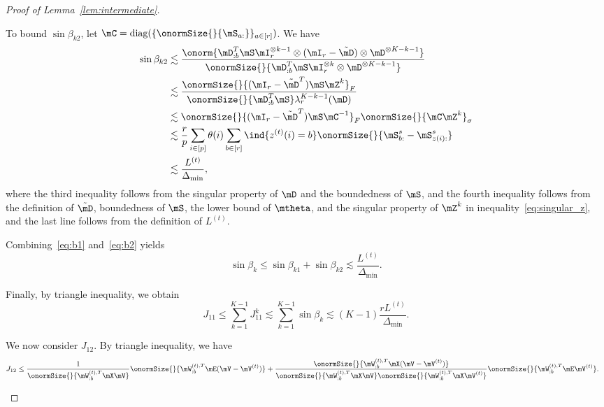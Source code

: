 \documentclass[lettersize,onecolumn,journal]{IEEEtran}
\theoremstyle{definition}
\theoremstyle{definition}
\def\fixme#1#2{\textbf{\color{red}[FIXME (#1): #2]}}
\begin{document}
\begin{proof}[Proof of Lemma~\ref{lem:intermediate}]
\begin{enumerate}[wide]
    To bound $\sin \beta_{k2}$, let $\mC = \text{diag}(\{\onormSize{}{\mS_{a:}}\}_{a \in [r]})$. We have 
    \begin{align}\label{eq:b2}
        \sin \beta_{k2} &\lesssim \frac{ \onorm{\mD_{:b}^{T} \mS \mI_r^{\otimes k-1} \otimes (\mI_r - \tilde \mD) \otimes \mD^{\otimes K-k-1} } }{\onormSize{}{\mD_{:b}^{T} \mS \mI_r^{\otimes k} \otimes \mD^{\otimes K-k-1} }  }\\
        & \lesssim \frac{ \onormSize{}{(\mI_r - \tilde \mD^T) \mS \mZ^k}_F }{\onormSize{}{\mD_{:b}^{T} \mS} \lambda_r^{K-k-1}(\mD)} \\
        & \lesssim \onormSize{ }{(\mI_r - \tilde \mD^T) \mS \mC^{-1}}_F \onormSize{}{\mC \mZ^k}_{\sigma}\\
        & \lesssim \frac{r}{p} \sum_{i \in [p]} \theta(i) \sum_{b \in [r]} \ind\{z^{(t)}(i) = b\} \onormSize{}{\mS_{b:}^s - \mS_{z(i):}^s} \\
        & \lesssim \frac{L^{(t)}}{\Delta_{\min}}, %
    \end{align}
    where the third inequality follows from the singular property of $\mD$ and the boundedness of $\mS$, and the fourth inequality follows from the definition of $\tilde \mD$, boundedness of $\mS$, the lower bound of $\mtheta$, and the singular property of $\mZ^k$ in inequality~\eqref{eq:singular_z}, and the last line follows from the definition of $L^{(t)}$.
    
  Combining~\eqref{eq:b1} and~\eqref{eq:b2} yields
    \begin{equation}
        \sin \beta_k \leq \sin \beta_{k1} + \sin \beta_{k2} \lesssim \frac{L^{(t)}}{\Delta_{\min}}.
    \end{equation}

    
       Finally, by triangle inequality, we obtain
    \begin{equation}\label{eq:j1}
        J_{11} \leq \sum_{k = 1}^{K-1} J_{11}^k \lesssim  \sum_{k = 1}^{K-1} \sin \beta_k  \lesssim (K-1)\frac{r L^{(t)}}{\Delta_{\min}}.
    \end{equation}
    

    
    We now consider $J_{12}$. By triangle inequality, we have 
    \begin{align}
        J_{12} &\leq \frac{ 1}{\onormSize{}{\mW_{:b}^{(t),T} \mX \mV }} \onormSize{}{\mW_{:b}^{(t),T} \mE (\mV-\mV^{(t)})}   +
        \frac{ \onormSize{}{\mW_{:b}^{(t),T} \mX (\mV-\mV^{(t)})} }{\onormSize{}{\mW_{:b}^{(t),T} \mX \mV }\onormSize{}{\mW_{:b}^{(t),T} \mX \mV^{(t)} }} \onormSize{}{\mW_{:b}^{(t),T} \mE \mV^{(t)} }.
    \end{align}


\end{enumerate}
\end{proof}
\end{document}
